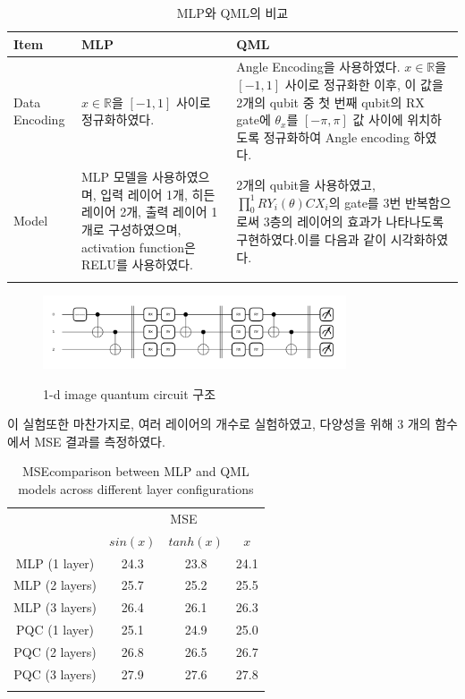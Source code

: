 \begin{itemize}
\begin{table}[ht]
    \centering
    \begin{tabular}{ l||p{5.5cm}||p{5.5cm}}
    \Xhline{3\arrayrulewidth}
    \textbf{Item} & \textbf{MLP} & \textbf{QML} \\
    \hline
    Data Encoding & $x \in \mathbb{R}$을 $[-1, 1]$ 사이로 정규화하였다. &
    Angle Encoding을 사용하였다. $x \in \mathbb{R}$을 $[-1, 1]$ 사이로 정규화한 이후, 이 값을 2개의 qubit 중 첫 번째 qubit의 RX gate에 $\theta_x$를 $[-\pi, \pi]$ 값 사이에 위치하도록 정규화하여 Angle encoding 하였다. \\
    \hline
    Model & MLP 모델을 사용하였으며, 입력 레이어 1개, 히든 레이어 2개, 출력 레이어 1개로 구성하였으며, activation function은 RELU를 사용하였다. &
    2개의 qubit을 사용하였고, $\prod_{0}^{1} RY_i(\theta)CX_i$의 gate를 3번 반복함으로써 3층의 레이어의 효과가 나타나도록 구현하였다.이를 다음과 같이 시각화하였다.{fig:1d-image} \\
    \Xhline{3\arrayrulewidth}
    \end{tabular}
    \caption{MLP와 QML의 비교}
    \label{tab:mlp_qml_comparison_1d}
\end{table}

\begin{figure}[h]
    \centering
    \includegraphics[width=0.8\textwidth]{figs/pqc_1d}\
\caption{1-d image quantum circuit 구조}
\label{fig:1d-image}
\end{figure}
\end{itemize}
\clearpage

이 실험또한 마찬가지로, 여러 레이어의 개수로 실험하였고, 다양성을 위해 3 개의 함수에서 MSE  결과를 측정하였다.

\begin{table}[ht]
    \centering
    \begin{tabular}{c|ccc}
    \Xhline{3\arrayrulewidth}
    \multirow{2}{*}{Layers} & \multicolumn{3}{c}{MSE} \\
    \cline{2-4}
    & $sin(x)$  & $tanh(x)$ & $x$ \\
    \hline
    MLP (1 layer) & 24.3 & 23.8 & 24.1 \\
    MLP (2 layers) & 25.7 & 25.2 & 25.5 \\
    MLP (3 layers) & 26.4 & 26.1 & 26.3 \\
    \hline
    PQC (1 layer) & 25.1 & 24.9 & 25.0 \\
    PQC (2 layers) & 26.8 & 26.5 & 26.7 \\
    PQC (3 layers) & 27.9 & 27.6 & 27.8 \\
    \Xhline{3\arrayrulewidth}
    \end{tabular}
    \caption{MSEcomparison between MLP and QML models across different layer configurations}
    \label{tab:mse_comparison}
\end{table}




